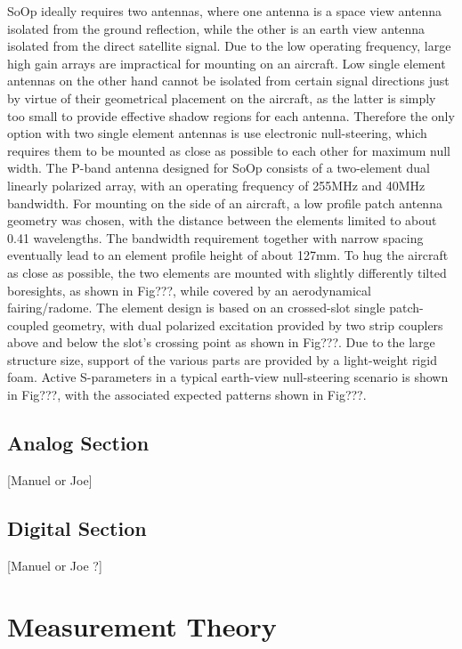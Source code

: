 \documentclass[draftcls,onecolumn]{IEEEtran}  %
\begin{document}
SoOp ideally requires two antennas, where one antenna is a space view antenna isolated from the ground reflection, while the other is an earth view antenna isolated from the direct satellite signal.  Due to the low operating frequency, large high gain arrays are impractical for mounting on an aircraft.  Low single element antennas on the other hand cannot be isolated from certain signal directions just by virtue of their geometrical placement on the aircraft, as the latter is simply too small to provide effective shadow regions for each antenna.  Therefore the only option with two single element antennas is use electronic null-steering, which requires them to be mounted as close as possible to each other for maximum null width.  
The P-band antenna designed for SoOp consists of a two-element dual linearly polarized array, with an operating frequency of 255MHz and 40MHz bandwidth.  For mounting on the side of an aircraft, a low profile patch antenna geometry was chosen, with the distance between the elements limited to about 0.41 wavelengths.  The bandwidth requirement together with narrow spacing eventually lead to an element profile height of about 127mm.  To hug the aircraft as close as possible, the two elements are mounted with slightly differently tilted boresights, as shown in Fig???, while covered by an aerodynamical fairing/radome.  
The element design is based on an crossed-slot single patch-coupled geometry, with dual polarized excitation provided by two strip couplers above and below the slot’s crossing point as shown in Fig???.  Due to the large structure size, support of the various parts are provided by a light-weight rigid foam.  
Active S-parameters in a typical earth-view null-steering scenario is shown in Fig???, with the associated expected patterns shown in Fig???.  


\subsection{Analog Section}
\label{sec:analog}
[Manuel or Joe]

\subsection{Digital Section}
\label{sec:digital}

[Manuel or Joe ?]

\section{Measurement Theory}
 \label{section:Algorithm}
\end{document}
